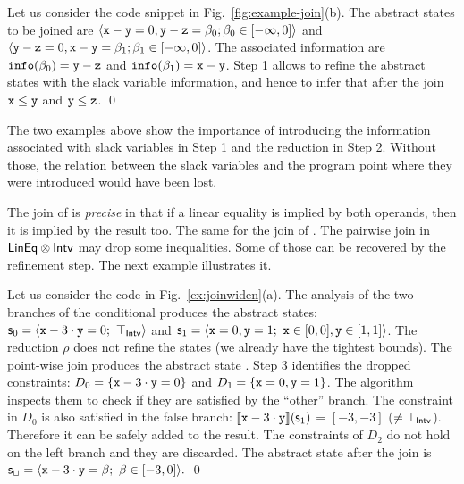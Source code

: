 \documentclass{llncs}
\begin{document}
\begin{example}
Let us consider the code snippet in Fig.~\ref{fig:example-join}(b).
The abstract states to be joined are 
\(
\langle \mathtt{x} -\mathtt{y} = 0, \mathtt{y} - \mathtt{z}  = \beta_{0};  \beta_{0} \in [-\infty, 0] \rangle 
\) and
\(
\langle \mathtt{y} -\mathtt{z} = 0, \mathtt{x} - \mathtt{y}  = \beta_{1};  \beta_{1} \in [-\infty, 0] \rangle
\).
The associated information are $\mathtt{info}( \beta_{0}) = \mathtt{y} -\mathtt{z}$ and $\mathtt{info}( \beta_{1}) = \mathtt{x} -\mathtt{y}$.
Step 1 allows to refine the abstract states with the slack variable information, and hence to infer that after the join $\mathtt{x} \leq \mathtt{y}$ and $\mathtt{y} \leq \mathtt{z}$. \qed
\end{example}




The two examples above show the importance of introducing the information associated with slack variables in Step 1 and the reduction in Step 2.
Without those, the relation between the slack variables and the program point where they were introduced would have been lost.



The join of \Lineq{} is \emph{precise} in that if a linear equality is implied by both operands, then it is implied by the result too.
The same for the join of \Intervals.
The pairwise join in $\mathsf{LinEq} \otimes \mathsf{Intv}$ may drop some inequalities.
Some of those can be recovered by the refinement step.
The next example illustrates it.


\begin{example}[Step 3]
Let us consider the code in Fig.~\ref{ex:joinwiden}(a).
The analysis of the two branches of the conditional  produces the abstract states: 
\(
\mathsf{\mathsf{s}}_0  = \langle \mathtt{x} - 3 \cdot \mathtt{y} = 0;\ \top_{\mathsf{Intv}} \rangle 
\) 
and
\(
\subpoly_1  =\tupla{\code{x} = 0, \code{y} = 1;\ \code{x} \in [0,0], \code{y} \in [1,1] }
\).
The reduction $\rho$ does not refine the states (we already have the tightest bounds).
The point-wise join produces the abstract state \topS.
Step 3 identifies the dropped constraints: $D_0 = \{\mathtt{x} - 3 \cdot \mathtt{y} = 0\}$ and $D_1 = \{\mathtt{x} = 0, \mathtt{y} = 1 \}$.
The algorithm  inspects them to check if they are satisfied by the ``other'' branch.
The constraint in $D_0$  is also satisfied in the false branch: $\llbracket \mathtt{\mathtt{x} - \mathrm{3} \cdot \mathtt{y}} \rrbracket(\mathsf{\mathsf{s}}_1)$ = $[-3,-3]$ ($\neq \top_{\mathsf{Intv}}$).
Therefore it can be safely added to the result.
The constraints of $D_2$ do not hold on the left branch and they are discarded. 
The abstract state after the join is 
\(
\mathsf{\mathsf{s}}_\sqcup =\langle \mathtt{x} - 3 \cdot \mathtt{y} = \beta_{};\ \beta_{} \in [-3,0]  \rangle.
\) \qed
\end{example}
\end{document}

